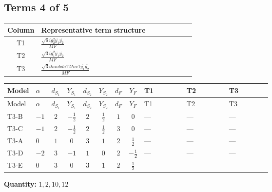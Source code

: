 \documentclass[8pt]{article}
\begin{document}
\begin{landscape}
\subsection*{Terms 4 of 5}
\begin{center}
\begin{tabular}{@{}c >{\raggedright\arraybackslash}p{0.82\linewidth}@{}}
\toprule
Column & Representative term structure \\
\midrule
T1 & \(\displaystyle \frac{\sqrt{6} i g_{2}^{2} \overline{y_{1}} \overline{y_{2}}}{MF}\) \\
\midrule
T2 & \(\displaystyle \frac{\sqrt{3} i g_{1}^{2} \overline{y_{1}} \overline{y_{2}}}{MF}\) \\
\midrule
T3 & \(\displaystyle \frac{\sqrt{3} i lambda12Inv1 \overline{y_{1}} \overline{y_{2}}}{MF}\) \\
\midrule
\bottomrule
\end{tabular}
\end{center}
\smallskip
\tiny
\begin{longtable}{@{}llcccccc >{\raggedright\arraybackslash}p{0.21\linewidth} >{\raggedright\arraybackslash}p{0.21\linewidth} >{\raggedright\arraybackslash}p{0.21\linewidth}@{}}
\toprule
Model & $\alpha$ & $d_{S_1}$ & $Y_{S_1}$ & $d_{S_2}$ & $Y_{S_2}$ & $d_F$ & $Y_F$ & T1 & T2 & T3 \\
\midrule
\endfirsthead
\toprule
Model & $\alpha$ & $d_{S_1}$ & $Y_{S_1}$ & $d_{S_2}$ & $Y_{S_2}$ & $d_F$ & $Y_F$ & T1 & T2 & T3 \\
\midrule
\endhead
T3-B & $-1$ & $2$ & $-\frac{1}{2}$ & $2$ & $\frac{1}{2}$ & $1$ & $0$ & --- & --- & --- \\
\midrule
T3-C & $-1$ & $2$ & $-\frac{1}{2}$ & $2$ & $\frac{1}{2}$ & $3$ & $0$ & --- & --- & --- \\
\midrule
T3-A & $0$ & $1$ & $0$ & $3$ & $1$ & $2$ & $\frac{1}{2}$ & --- & --- & --- \\
\midrule
T3-D & $-2$ & $3$ & $-1$ & $1$ & $0$ & $2$ & $-\frac{1}{2}$ & --- & --- & --- \\
\midrule
T3-E & $0$ & $3$ & $0$ & $3$ & $1$ & $2$ & $\frac{1}{2}$ & \scriptsize\adjustbox{max width=\linewidth}{$\begin{gathered} - \frac{\sqrt{6} i g_{2}^{2} \overline{y_{1}} \overline{y_{2}}}{6 MF}\end{gathered}$} & \scriptsize\adjustbox{max width=\linewidth}{$\begin{gathered} - \frac{\sqrt{3} i g_{1}^{2} \overline{y_{1}} \overline{y_{2}}}{8 MF}\end{gathered}$} & \scriptsize\adjustbox{max width=\linewidth}{$\begin{gathered} \frac{\sqrt{3} i lambda12Inv1 \overline{y_{1}} \overline{y_{2}}}{6 MF}\end{gathered}$} \\
\midrule
\bottomrule
\end{longtable}
\clearpage
\noindent\textbf{Quantity: }$\mathrm{1,2,10,12}$\par\smallskip

\end{landscape}
\end{document}
